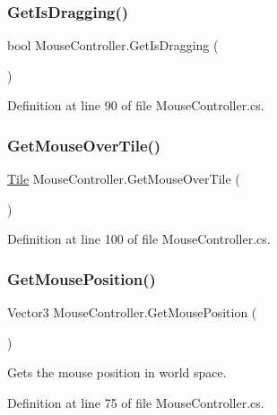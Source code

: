 \subsubsection{\texorpdfstring{Get\+Is\+Dragging()}{GetIsDragging()}}
{\footnotesize\ttfamily bool Mouse\+Controller.\+Get\+Is\+Dragging (\begin{DoxyParamCaption}{ }\end{DoxyParamCaption})}



Definition at line 90 of file Mouse\+Controller.\+cs.

\mbox{\label{class_mouse_controller_a47ce689ad82385d2fdc959cfca34c6b5}} 
\subsubsection{\texorpdfstring{Get\+Mouse\+Over\+Tile()}{GetMouseOverTile()}}
{\footnotesize\ttfamily \hyperlink{class_tile}{Tile} Mouse\+Controller.\+Get\+Mouse\+Over\+Tile (\begin{DoxyParamCaption}{ }\end{DoxyParamCaption})}



Definition at line 100 of file Mouse\+Controller.\+cs.

\mbox{\label{class_mouse_controller_ad6ab2c64fc9448c083bba1dcc834a642}} 
\subsubsection{\texorpdfstring{Get\+Mouse\+Position()}{GetMousePosition()}}
{\footnotesize\ttfamily Vector3 Mouse\+Controller.\+Get\+Mouse\+Position (\begin{DoxyParamCaption}{ }\end{DoxyParamCaption})}



Gets the mouse position in world space. 



Definition at line 75 of file Mouse\+Controller.\+cs.

